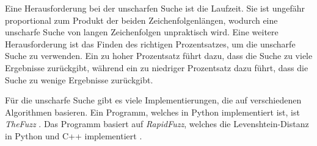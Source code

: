 Eine Herausforderung bei der unscharfen Suche ist die Laufzeit.
Sie ist ungefähr proportional zum Produkt der beiden Zeichenfolgenlängen, wodurch eine unscharfe Suche von langen Zeichenfolgen unpraktisch wird.
Eine weitere Herausforderung ist das Finden des richtigen Prozentsatzes, um die unscharfe Suche zu verwenden.
Ein zu hoher Prozentsatz führt dazu, dass die Suche zu viele Ergebnisse zurückgibt, während ein zu niedriger Prozentsatz dazu führt, dass die Suche zu wenige Ergebnisse zurückgibt.

Für die unscharfe Suche gibt es viele Implementierungen, die auf verschiedenen Algorithmen basieren.
Ein Programm, welches in Python implementiert ist, ist \emph{TheFuzz} \autocite{noauthor_seatgeekthefuzz_2024}.
Das Programm basiert auf \emph{RapidFuzz}, welches die Levenshtein-Distanz in Python und C++ implementiert \autocites{noauthor_rapidfuzzrapidfuzz_2024}.
